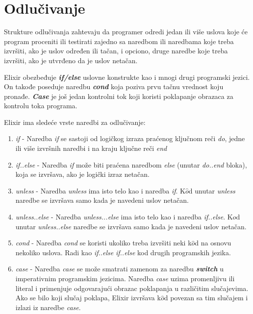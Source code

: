 \documentclass[12pt,oneside]{memoir}
\begin{document}
\section{Odlučivanje}

Strukture odlučivanja zahtevaju da programer odredi jedan ili više uslova koje će program proceniti ili testirati zajedno sa naredbom ili naredbama koje treba izvršiti, ako je uslov određen ili tačan, i opciono, druge naredbe koje treba izvršiti, ako je utvrđeno da je uslov netačan.

Elixir obezbeđuje \textbf{\textit{if/else}} uslovne konstrukte kao i mnogi drugi programski jezici. On takođe poseduje naredbu \textbf{\textit{cond}} koja poziva prvu tačnu vrednost koju pronađe. \textbf{\textit{Case}} je još jedan kontrolni tok koji koristi poklapanje obrazaca za kontrolu toka programa.

Elixir ima sledeće vrste naredbi za odlučivanje:

\begin{enumerate}
\itemsep0em 
    \item{\textit{if} - Naredba \textit{if} se sastoji od logičkog izraza praćenog ključnom reči \textit{do}, jedne ili više izvršnih naredbi i na kraju ključne reči \textit{end}}
    \item{\textit{if..else} - Naredba \textit{if} može biti praćena naredbom \textit{else} (unutar \textit{do..end} bloka), koja se izvršava, ako je logički izraz netačan.}
    \item{\textit{unless} - Naredba \textit{unless} ima isto telo kao i naredba \textit{if}. K$\hat{o}$d unutar \textit{unless} naredbe se izvršava samo kada je navedeni uslov netačan.}
    \item{\textit{unless..else} - Naredba \textit{unless...else} ima isto telo kao i naredba \textit{if..else}. K$\hat{o}$d unutar \textit{unless..else} naredbe se izvršava samo kada je navedeni uslov netačan.}
    \item{\textit{cond} - Naredba \textit{cond} se koristi ukoliko treba izvršiti neki k$\hat{o}$d na osnovu nekoliko uslova. Radi kao \textit{if..else} \textit{if..else} kod drugih programskih jezika.}
    \item{\textit{case} - Naredba \textit{case}  se može smatrati zamenom za naredbu \textbf{\textit{switch}} u imperativnim programskim jezicima. Naredba \textit{case} uzima promenljivu ili literal i primenjuje odgovarajući obrazac poklapanja u različitim slučajevima. Ako se bilo koji slučaj poklapa, Elixir izvršava k$\hat{o}$d povezan sa tim slučajem i izlazi iz naredbe \textit{case}.}
\end{enumerate}
\end{document}

